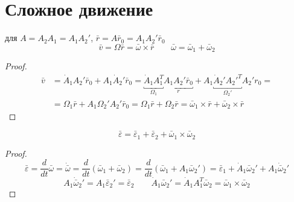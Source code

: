 \documentclass[crop=false]{standalone}
\begin{document}
\section{Сложное движение}
\keypoint
для $A = A_2 A_1 = A_1 A_2'$, $\bar r = A \bar r_0 = A_1 A_2' \bar r_0$
\[\bar v = \Omega \bar r = \bar \omega \times \bar r \qquad \bar \omega = \bar \omega_1 + \bar \omega_2\]
\begin{proof}\[
\begin{aligned}
\bar v &= \dot A_1  A_2' \bar r_0 + A_1 \dot A_2' \bar r_0 = \underbracket{\dot A_1 A_1^T}_{\Omega_1} \underbracket{A_1 A_2' \bar r_0}_r + A_1 \underbracket{\dot A_2' A_2'^T}_{\Omega_2'} A_2' r_0 = \\
&= \Omega_1 \bar r + A_1 \Omega_2' A_2' \bar r_0 = \Omega_1 \bar r + \Omega_2 \bar r = \bar \omega_1 \times \bar r + \bar \omega_2 \times \bar r
\end{aligned}
\]
\end{proof}
\noindent \keypoint \[\boxed{\bar \varepsilon = \bar \varepsilon_1 + \bar \varepsilon_2 + \bar \omega_1 \times \bar \omega_2}\]
\begin{proof}
    \[\bar \varepsilon = \frac{d}{dt} \bar \omega = \dot{\bar \omega} = \frac{d}{dt}{\left(\bar \omega_1 + \bar \omega_2\right)} = \frac{d}{dt} (\bar \omega_1 + A_1 \bar \omega_2') = \bar \varepsilon_1 + \dot A_1 \bar \omega_2' + A_1 \dot {\bar \omega}_2'\]
    \[A_1 \dot{\bar {\omega}}_2' = A_1 \bar \varepsilon_2' = \bar \varepsilon_2  \qquad \dot A_1 \bar \omega_2' = \dot A_1 A_1^T \bar \omega_2 = \bar \omega_1 \times \bar \omega_2\]
\end{proof}
\end{document}
